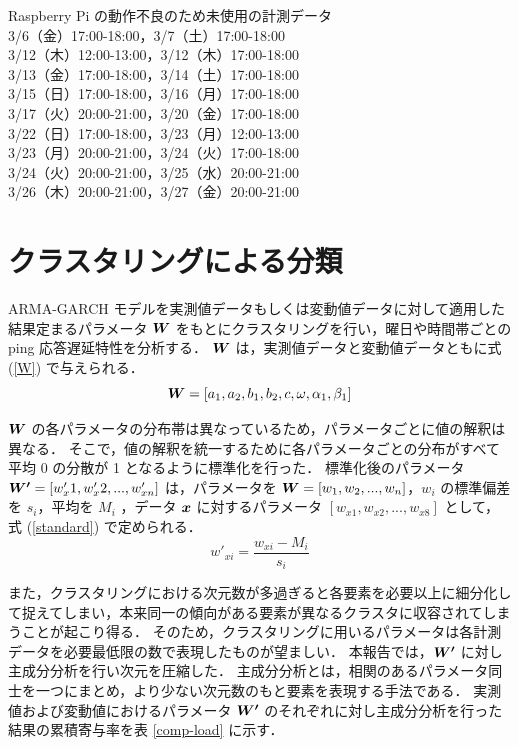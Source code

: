 \documentclass[technicalreport]{ieicej}
\begin{document}
\begin{center}
Raspberry Pi の動作不良のため未使用の計測データ\\
3/6（金）17:00-18:00，3/7（土）17:00-18:00\\
3/12（木）12:00-13:00，3/12（木）17:00-18:00\\
3/13（金）17:00-18:00，3/14（土）17:00-18:00\\
3/15（日）17:00-18:00，3/16（月）17:00-18:00\\
3/17（火）20:00-21:00，3/20（金）17:00-18:00\\
3/22（日）17:00-18:00，3/23（月）12:00-13:00\\
3/23（月）20:00-21:00，3/24（火）17:00-18:00\\
3/24（火）20:00-21:00，3/25（水）20:00-21:00\\
3/26（木）20:00-21:00，3/27（金）20:00-21:00\\
\end{center}
\section{クラスタリングによる分類}
 ARMA-GARCH モデルを実測値データもしくは変動値データに対して適用した結果定まるパラメータ $\mbox{\boldmath $W$}$ をもとにクラスタリングを行い，曜日や時間帯ごとの ping 応答遅延特性を分析する．
$\mbox{\boldmath $W$}$ は，実測値データと変動値データともに式 (\ref{W}) で与えられる． 
\begin{equation}
\mbox{\boldmath $W$} = [a_1, a_2, b_1, b_2, c, \omega, \alpha_1, \beta_1]
\label{W}
\end{equation}

$\mbox{\boldmath $W$}$ の各パラメータの分布帯は異なっているため，パラメータごとに値の解釈は異なる．
そこで，値の解釈を統一するために各パラメータごとの分布がすべて平均 0 の分散が 1 となるように標準化を行った．
標準化後のパラメータ $\mbox{\boldmath $W'$} = [w'_x1, w'_x2,...,w'_{xn}]$ は，パラメータを $\mbox{\boldmath $W$} = [w_1,w_2,...,w_n]$，$w_i$ の標準偏差を $s_i$，平均を $M_i$ ，データ $\mbox{\boldmath $x$}$ に対するパラメータ $[w_{x1},w_{x2},...,w_{x8}]$ として，式 (\ref{standard}) で定められる．
\begin{equation}
w'_{xi} = \frac{w_{xi} - M_i}{s_i}
\label{standard}
\end{equation}

また，クラスタリングにおける次元数が多過ぎると各要素を必要以上に細分化して捉えてしまい，本来同一の傾向がある要素が異なるクラスタに収容されてしまうことが起こり得る．
そのため，クラスタリングに用いるパラメータは各計測データを必要最低限の数で表現したものが望ましい．
本報告では，$\mbox{\boldmath $W'$}$ に対し主成分分析\cite{jolliffe2016principal}を行い次元を圧縮した．
主成分分析とは，相関のあるパラメータ同士を一つにまとめ，より少ない次元数のもと要素を表現する手法である．
実測値および変動値におけるパラメータ $\mbox{\boldmath $W'$}$ のそれぞれに対し主成分分析を行った結果の累積寄与率を表 \ref{comp-load} に示す．
\end{document}
